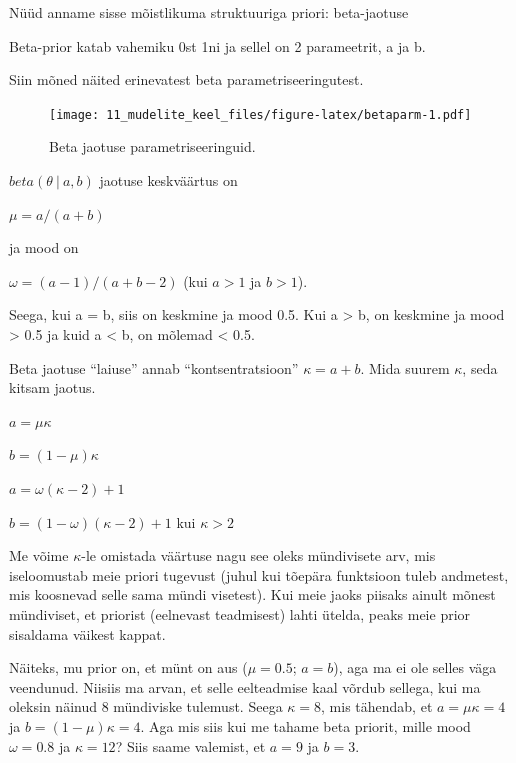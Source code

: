 \documentclass[]{book}
\begin{document}
Nüüd anname sisse mõistlikuma struktuuriga priori: beta-jaotuse

Beta-prior katab vahemiku 0st 1ni ja sellel on 2 parameetrit, a ja b.

Siin mõned näited erinevatest beta parametriseeringutest.



\begin{figure}
\centering
\texttt{[image: 11\_mudelite\_keel\_files/figure-latex/betaparm-1.pdf]}
\caption{\label{fig:betaparm}Beta jaotuse parametriseeringuid.}
\end{figure}

\(beta(\theta~\vert~a,b)\) jaotuse keskväärtus on

\(\mu = a/(a + b)\)

ja mood on

\(\omega= (a-1)/(a + b-2)\) (kui \(a > 1\) ja \(b > 1\)).

Seega, kui a = b, siis on keskmine ja mood 0.5. Kui a \textgreater{} b,
on keskmine ja mood \textgreater{} 0.5 ja kuid a \textless{} b, on
mõlemad \textless{} 0.5.

Beta jaotuse ``laiuse'' annab ``kontsentratsioon'' \(\kappa = a + b\).
Mida suurem \(\kappa\), seda kitsam jaotus.

\(a = \mu\kappa\)

\(b = (1-\mu)\kappa\)

\(a = \omega(\kappa-2) + 1\)

\(b = (1-\omega)(\kappa-2)+1\) kui \(\kappa > 2\)

Me võime \(\kappa\)-le omistada väärtuse nagu see oleks mündivisete arv,
mis iseloomustab meie priori tugevust (juhul kui tõepära funktsioon
tuleb andmetest, mis koosnevad selle sama mündi visetest). Kui meie
jaoks piisaks ainult mõnest mündiviset, et priorist (eelnevast
teadmisest) lahti ütelda, peaks meie prior sisaldama väikest kappat.

Näiteks, mu prior on, et münt on aus (\(\mu = 0.5\); \(a = b\)), aga ma
ei ole selles väga veendunud. Niisiis ma arvan, et selle eelteadmise
kaal võrdub sellega, kui ma oleksin näinud 8 mündiviske tulemust. Seega
\(\kappa = 8\), mis tähendab, et \(a = \mu\kappa = 4\) ja
\(b = (1-\mu)\kappa = 4\). Aga mis siis kui me tahame beta priorit,
mille mood \(\omega = 0.8\) ja \(\kappa = 12\)? Siis saame valemist, et
\(a = 9\) ja \(b = 3\).
\end{document}
